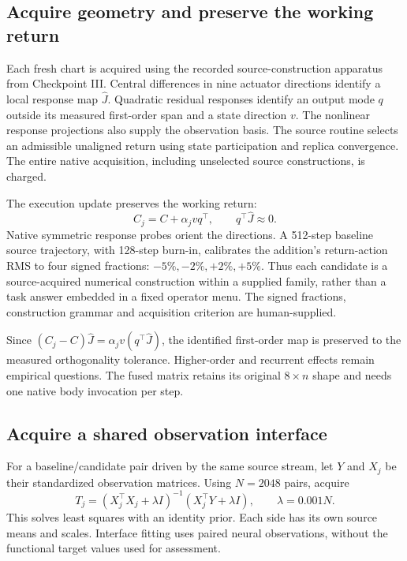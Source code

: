 \documentclass[11pt]{article}
\begin{document}
\subsection{Acquire geometry and preserve the working return}
Each fresh chart is acquired using the recorded source-construction apparatus from Checkpoint III. Central differences in nine actuator directions identify a local response map $\widehat J$. Quadratic residual responses identify an output mode $q$ outside its measured first-order span and a state direction $v$. The nonlinear response projections also supply the observation basis. The source routine selects an admissible unaligned return using state participation and replica convergence. The entire native acquisition, including unselected source constructions, is charged.

The execution update preserves the working return:
\begin{equation}
 C_j=C+\alpha_jvq^\top,\qquad q^\top\widehat J\approx0.
\end{equation}
Native symmetric response probes orient the directions. A 512-step baseline source trajectory, with 128-step burn-in, calibrates the addition's return-action RMS to four signed fractions: $-5\%,-2\%,+2\%,+5\%$. Thus each candidate is a source-acquired numerical construction within a supplied family, rather than a task answer embedded in a fixed operator menu. The signed fractions, construction grammar and acquisition criterion are human-supplied.

Since $(C_j-C)\widehat J=\alpha_jv(q^\top\widehat J)$, the identified first-order map is preserved to the measured orthogonality tolerance. Higher-order and recurrent effects remain empirical questions. The fused matrix retains its original $8\times n$ shape and needs one native body invocation per step.

\subsection{Acquire a shared observation interface}
For a baseline/candidate pair driven by the same source stream, let $Y$ and $X_j$ be their standardized observation matrices. Using $N=2048$ pairs, acquire
\begin{equation}
 T_j=(X_j^\top X_j+\lambda I)^{-1}(X_j^\top Y+\lambda I),
 \qquad \lambda=0.001N.
\end{equation}
This solves least squares with an identity prior. Each side has its own source means and scales. Interface fitting uses paired neural observations, without the functional target values used for assessment.
\end{document}
